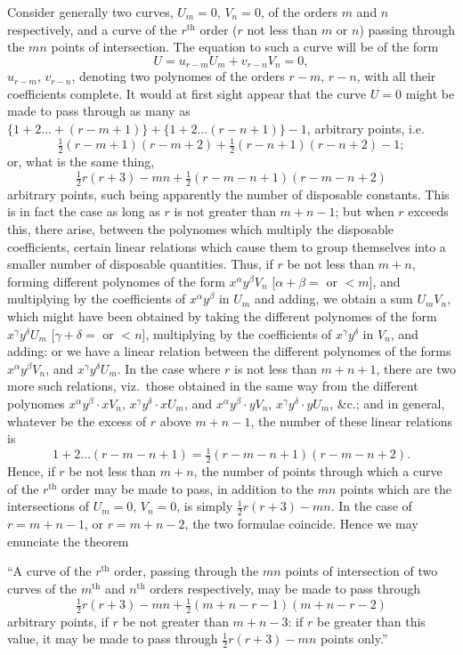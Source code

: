 \documentclass[11pt]{article}
\providecommand{\half}{\tfrac12}
\begin{document}
\clearpage

Consider generally two curves, $U_m=0$, $V_n=0$, of the orders $m$ and $n$
respectively, and a curve of the $r^{\text{th}}$ order ($r$ not less than $m$ or $n$)
passing through the $mn$ points of intersection. The equation to such a curve will be
of the form
\[
U=u_{r-m}U_m+v_{r-n}V_n=0,
\]
$u_{r-m}$, $v_{r-n}$, denoting two polynomes of the orders $r-m$, $r-n$, with all
their coefficients complete. It would at first sight appear that the curve $U=0$ might
be made to pass through as many as
$\{1+2\ldots+(r-m+1)\}+\{1+2\ldots(r-n+1)\}-1$, arbitrary points, i.e.
\[
\half(r-m+1)(r-m+2)+\half(r-n+1)(r-n+2)-1;
\]
or, what is the same thing,
\[
\half r(r+3)-mn+\half(r-m-n+1)(r-m-n+2)
\]
arbitrary points, such being apparently the number of disposable constants. This is in
fact the case as long as $r$ is not greater than $m+n-1$; but when $r$ exceeds this,
there arise, between the polynomes which multiply the disposable coefficients, certain
linear relations which cause them to group themselves into a smaller number of
disposable quantities. Thus, if $r$ be not less than $m+n$, forming different
polynomes of the form $x^{\alpha}y^{\beta}V_n$ [$\alpha+\beta=$ or $<m$], and
multiplying by the coefficients of $x^{\alpha}y^{\beta}$ in $U_m$ and adding, we obtain
a sum $U_mV_n$, which might have been obtained by taking the different polynomes
of the form $x^{\gamma}y^{\delta}U_m$ [$\gamma+\delta=$ or $<n$], multiplying by
the coefficients of $x^{\gamma}y^{\delta}$ in $V_n$, and adding: or we have a linear
relation between the different polynomes of the forms $x^{\alpha}y^{\beta}V_n$, and
$x^{\gamma}y^{\delta}U_m$. In the case where $r$ is not less than $m+n+1$, there
are two more such relations, viz.\ those obtained in the same way from the different
polynomes $x^{\alpha}y^{\beta}\cdot xV_n$, $x^{\gamma}y^{\delta}\cdot xU_m$, and
$x^{\alpha}y^{\beta}\cdot yV_n$, $x^{\gamma}y^{\delta}\cdot yU_m$, \&c.; and in
general, whatever be the excess of $r$ above $m+n-1$, the number of these linear
relations is
\[
1+2\ldots(r-m-n+1)=\half(r-m-n+1)(r-m-n+2).
\]
Hence, if $r$ be not less than $m+n$, the number of points through which a curve of
the $r^{\text{th}}$ order may be made to pass, in addition to the $mn$ points which are
the intersections of $U_m=0$, $V_n=0$, is simply $\half r(r+3)-mn$. In the case of
$r=m+n-1$, or $r=m+n-2$, the two formulae coincide. Hence we may enunciate the
theorem

``A curve of the $r^{\text{th}}$ order, passing through the $mn$ points of intersection
of two curves of the $m^{\text{th}}$ and $n^{\text{th}}$ orders respectively, may be
made to pass through
\[
\half r(r+3)-mn+\half(m+n-r-1)(m+n-r-2)
\]
arbitrary points, if $r$ be not greater than $m+n-3$: if $r$ be greater than this
value, it may be made to pass through $\half r(r+3)-mn$ points only.''
\end{document}
